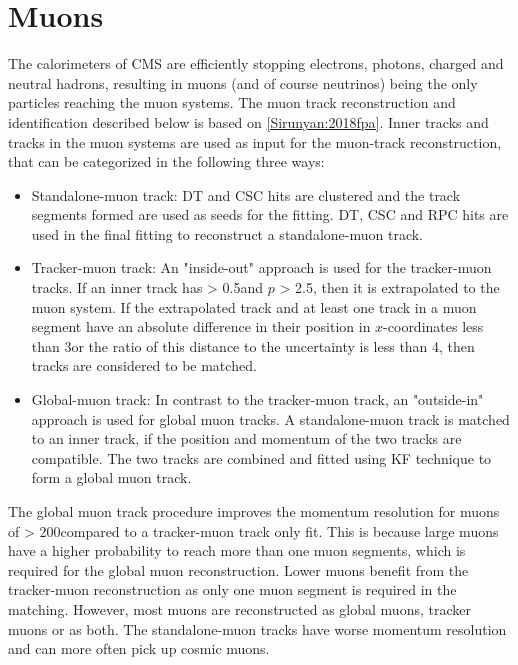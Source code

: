 \section{Muons}
The calorimeters of CMS are efficiently stopping electrons, photons, charged and neutral hadrons, resulting in muons (and of course neutrinos) being the only particles reaching the muon systems.  
The muon track reconstruction and identification described below is based on \ref{Sirunyan:2018fpa}. 
Inner tracks and tracks in the muon systems are used as input for the muon-track reconstruction, that can be categorized in the following three ways:
\begin{itemize}\addtolength{\itemsep}{0.5\baselineskip}
\item Standalone-muon track:
DT and CSC hits are clustered and the track segments formed are used as seeds for the fitting. DT, CSC and RPC hits are used in the final fitting to reconstruct a standalone-muon track.
\item Tracker-muon track:
An "inside-out" approach is used for the tracker-muon tracks. 
If an inner track has \pt > 0.5\GeV and $p$ > 2.5\GeV, then it is extrapolated to the muon system. 
If the extrapolated track and at least one track in a muon segment have an absolute difference in their position in $x$-coordinates less than 3\cm or the ratio of this distance to the uncertainty is less than 4, then tracks are considered to be matched.  
\item Global-muon track:
In contrast to the tracker-muon track, an "outside-in" approach is used for global muon tracks. 
A standalone-muon track is matched to an inner track, if the position and momentum of the two tracks are compatible. 
The two tracks are combined and fitted using KF technique to form a global muon track. 
\end{itemize}
The global muon track procedure improves the momentum resolution for muons of \pt > 200\GeV compared to a tracker-muon track only fit. 
This is because large \pt muons have a higher probability to reach more than one muon segments, which is required for the global muon reconstruction. 
Lower \pt muons benefit from the tracker-muon reconstruction as only one muon segment is required in the matching. 
However, most muons are reconstructed as global muons, tracker muons or as both. The standalone-muon tracks have worse momentum resolution and can more often pick up cosmic muons. 

